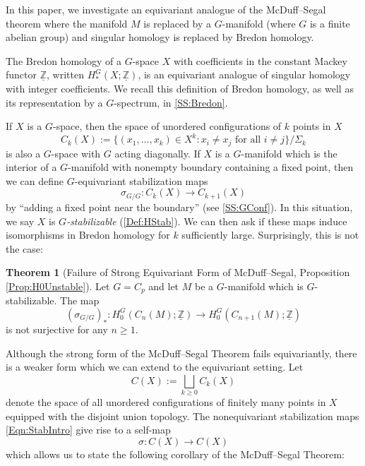 \documentclass[11pt]{amsart}
\theoremstyle{definition}
\numberwithin{equation}{subsection} %
\newtheorem{thmx}{Theorem}
\def\mfz{\underline{\mathbb{Z}}}
\begin{document}
In this paper, we investigate an equivariant analogue of the McDuff--Segal theorem where the manifold $M$ is replaced by a $G$-manifold (where $G$ is a finite abelian group) and singular homology is replaced by Bredon homology. 

The Bredon homology of a $G$-space $X$ with coefficients in the constant Mackey functor $\mfz$, written $H^G_*(X; \mfz)$, is an equivariant analogue of singular homology with integer coefficients. We recall this definition of Bredon homology, as well as its representation by a $G$-spectrum, in \cref{SS:Bredon}.

If $X$ is a $G$-space, then the space of unordered configurations of $k$ points in $X$
$$C_k(X) := \{(x_1,\ldots,x_k) \in X^k: x_i \neq x_j \text{ for all } i\neq j\}/\Sigma_k$$
is also a $G$-space with $G$ acting diagonally. If $X$ is a $G$-manifold which is the interior of a $G$-manifold with nonempty boundary containing a fixed point, then we can define $G$-equivariant stabilization maps
\begin{equation}\label{Eqn:FPGIntro}
\sigma_{G/G}: C_k(X) \to C_{k+1}(X)
\end{equation}
by ``adding a fixed point near the boundary'' (see \cref{SS:GConf}). In this situation, we say $X$ is \emph{$G$-stabilizable} (\cref{Def:HStab}). We can then ask if these maps induce isomorphisms in Bredon homology for $k$ sufficiently large. Surprisingly, this is not the case:

\begin{thmx}[Failure of Strong Equivariant Form of McDuff--Segal, Proposition \ref{Prop:H0Unstable}]\label{MT:BredonFails}
Let $G=C_p$ and let $M$ be a $G$-manifold which is $G$-stabilizable. The map
\begin{equation}\label{Eqn:GStabIntro}
(\sigma_{G/G})_*: H_0^G(C_n(M); \mfz) \to H_0^G(C_{n+1}(M); \mfz)
\end{equation}
is not surjective for any $n \geq 1$.
\end{thmx}

Although the strong form of the McDuff--Segal Theorem fails equivariantly, there is a weaker form which we can extend to the equivariant setting. Let
$$C(X) := \bigsqcup_{k \geq 0} C_k(X)$$
denote the space of all unordered configurations of finitely many points in $X$ equipped with the disjoint union topology. The nonequivariant stabilization maps \eqref{Eqn:StabIntro} give rise to a self-map
\begin{equation}\label{Eqn:BigStabIntro}
\sigma: C(X) \to C(X)
\end{equation}
which allows us to state the following corollary of the McDuff--Segal Theorem:
\end{document}
